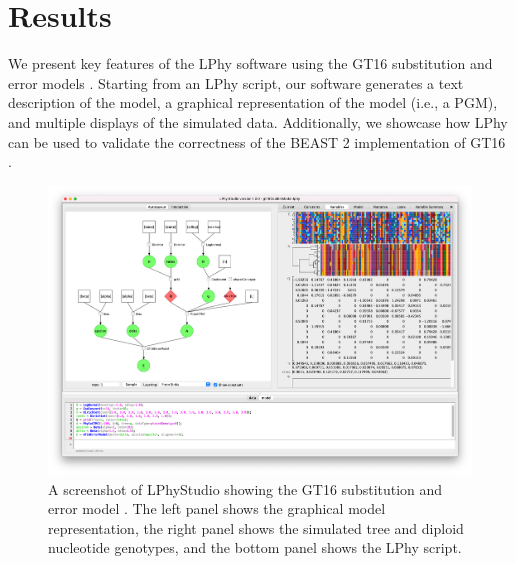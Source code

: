 \documentclass[10pt,letterpaper,table]{article}
\begin{document}

\section{Results}
We present key features of the LPhy software using the GT16 substitution and error models \cite{kozlov2022cellphy}. 
Starting from an LPhy script, our software generates a text description of the model, a graphical representation of the model (i.e., a PGM), and multiple displays of the simulated data. 
Additionally, we showcase how LPhy can be used to validate the correctness of the BEAST 2 implementation of GT16 \cite{chen2022accounting}. 


\begin{figure}[!ht]
    \centering
    \includegraphics[width=\textwidth]{figs_plos/lphystudio-gt16-mac.jpg}
    \caption{A screenshot of LPhyStudio showing the GT16 substitution and error model \cite{kozlov2022cellphy, chen2022accounting}. 
    The left panel shows the graphical model representation, the right panel shows the simulated tree and diploid nucleotide genotypes, and the bottom panel shows the LPhy script. }
\end{figure}
\end{document}
